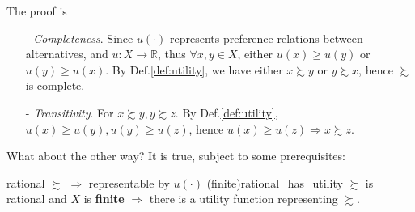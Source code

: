 The proof is
\begin{enumerate}
    \item[-] \textit{Completeness}. Since $u(\cdot)$ represents preference relations between alternatives, and $u:X\rightarrow\mathbb{R}$, thus $\forall x,y\in X$, either $u(x)\geq u(y)$ or $u(y) \geq u(x)$. By Def.\ref{def:utility}, we have either $x\succsim y$ or $y\succsim x$, hence $\succsim$ is complete.
    \item[-] \textit{Transitivity}. For $x\succsim y,y\succsim z$. By Def.\ref{def:utility}, $u(x)\geq u(y),u(y)\geq u(z)$, hence $u(x)\geq u(z)\Rightarrow x\succsim z$.
\end{enumerate}

What about the other way? It is true, subject to some prerequisites:
\begin{theorem}{rational $\succsim$ $\Rightarrow$ representable by $u(\cdot)$ (finite)}{rational_has_utility}
    $\succsim$ is rational and $X$ is \textbf{finite} $\Rightarrow$ there is a utility function representing $\succsim$.
\end{theorem}

